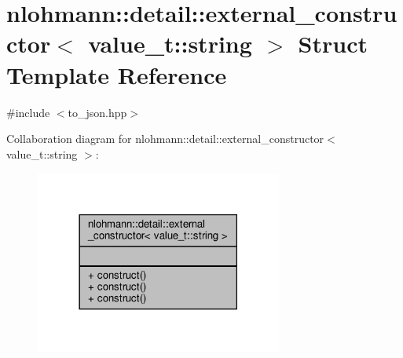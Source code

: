 \hypertarget{structnlohmann_1_1detail_1_1external__constructor_3_01value__t_1_1string_01_4}{}\section{nlohmann\+:\+:detail\+:\+:external\+\_\+constructor$<$ value\+\_\+t\+:\+:string $>$ Struct Template Reference}
\label{structnlohmann_1_1detail_1_1external__constructor_3_01value__t_1_1string_01_4}


{\ttfamily \#include $<$to\+\_\+json.\+hpp$>$}



Collaboration diagram for nlohmann\+:\+:detail\+:\+:external\+\_\+constructor$<$ value\+\_\+t\+:\+:string $>$\+:\nopagebreak
\begin{figure}[H]
\begin{center}
\leavevmode
\includegraphics[width=230pt]{structnlohmann_1_1detail_1_1external__constructor_3_01value__t_1_1string_01_4__coll__graph}
\end{center}
\end{figure}

